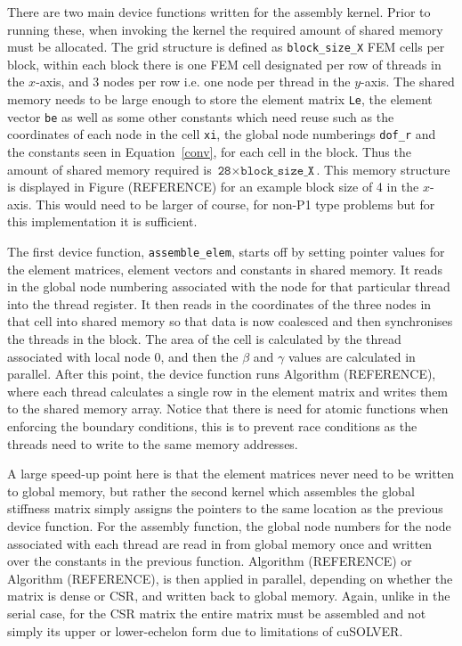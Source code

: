 There are two main device functions written for the assembly kernel. Prior to running these, when invoking the kernel the required amount of shared memory must be allocated. The grid structure is defined as \texttt{block\_size\_X} FEM cells per block, within each block there is one FEM cell designated per row of threads in the $x$-axis, and 3 nodes per row i.e. one node per thread in the $y$-axis. The shared memory needs to be large enough to store the element matrix \texttt{Le}, the element vector \texttt{be} as well as some other constants which need reuse such as the coordinates of each node in the cell \texttt{xi}, the global node numberings \texttt{dof\_r} and the constants seen in Equation~\eqref{conv}, for each cell in the block. Thus the amount of shared memory required is $\texttt{28}\times\texttt{block\_size\_X}$. This memory structure is displayed in Figure (REFERENCE) for an example block size of 4 in the $x$-axis. This would need to be larger of course, for non-P1 type problems but for this implementation it is sufficient.

The first device function, \texttt{assemble\_elem}, starts off by setting pointer values for the element matrices, element vectors and constants in shared memory. It reads in the global node numbering associated with the node for that particular thread into the thread register. It then reads in the coordinates of the three nodes in that cell into shared memory so that data is now coalesced and then synchronises the threads in the block. The area of the cell is calculated by the thread associated with local node 0, and then the $\beta$ and $\gamma$ values are calculated in parallel. After this point, the device function runs Algorithm (REFERENCE), where each thread calculates a single row in the element matrix and writes them to the shared memory array. Notice that there is need for atomic functions when enforcing the boundary conditions, this is to prevent race conditions as the threads need to write to the same memory addresses. 

A large speed-up point here is that the element matrices never need to be written to global memory, but rather the second kernel which assembles the global stiffness matrix simply assigns the pointers to the same location as the previous device function. For the assembly function, the global node numbers for the node associated with each thread are read in from global memory once and written over the constants in the previous function. Algorithm (REFERENCE) or Algorithm (REFERENCE), is then applied in parallel, depending on whether the matrix is dense or CSR, and written back to global memory. Again, unlike in the serial case, for the CSR matrix the entire matrix must be assembled and not simply its upper or lower-echelon form due to limitations of cuSOLVER.

